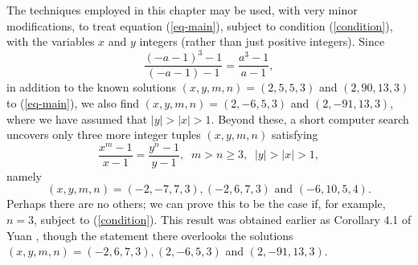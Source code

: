 The techniques employed in this chapter may be used, with very minor modifications, to treat equation (\ref{eq-main}), subject to condition (\ref{condition}), with the variables $x$ and $y$ integers (rather than just positive integers). Since 
$$
\frac{(-a-1)^3-1}{(-a-1)-1} = \frac{a^3-1}{a-1},
$$
in addition to the known solutions $(x,y,m,n)=(2,5,5,3)$ and $(2,90,13,3)$ to (\ref{eq-main}),
we also find  $(x,y,m,n)=(2,-6,5,3)$ and $(2,-91,13,3)$, where we have assumed that $|y|>|x|>1$.
Beyond these, a short computer search uncovers only three more integer tuples $(x,y,m,n)$ satisfying
$$
\frac{x^m-1}{x-1} = \frac{y^n-1}{y-1}, \; \; m > n \geq 3, \; \; |y| > |x| >1,
$$
namely
$$
(x,y,m,n)=(-2,-7,7,3), (-2,6,7,3) \mbox{ and }  (-6,10,5,4).
$$
Perhaps there are no others; we can prove this to be the case if, for example, $n=3$, subject to (\ref{condition}). This result was obtained earlier as Corollary 4.1 of Yuan \cite{Yu0}, though the statement there overlooks the solutions $(x,y,m,n)= (-2,6,7,3), (2,-6,5,3)$ and $(2,-91,13,3)$.



\endinput

\edit{some added stuff:}
\edit{FROM BEGHKR STARTS HERE}


. In the worst case scenario, the method in \cite{TW3} would reduce to $h^v$ such equations, where $h$ is the class number of $K$. This becomes computationally inefficient when the class number is large since, as we will see in the next section, we will need to apply a principal ideal test to each such case. Instead of this, we apply the method of \cite{GhKaMaSi}, which gives only $\kappa/2$ $S$-unit equations, where $\kappa$ is the number of roots of unity in $K$ (typically this means only one $S$-unit equation). We now describe this second method. 

In many cases, the method described above is far more efficient than that of Tzanakis-de Weger \cite{TW3}. However, there are values of $x$ where computing the class group may prove very costly. In fact, for these values of $x$, it may happen that class group computations  take longer than directly running a  principal ideal test on each ideal equation. In such cases, we return to the method of \cite{TW3}, which we now describe. 
\edit{end of added stuff}

I'd like to thank the Elysian Room and Pallet Coffee for not kicking me out of their establishments during the arduous writing process, and my lovely lounge chair for (literally) supporting me after closing hours. 


Any text after an \endinput is ignored.
You could put scraps here or things in progress.
